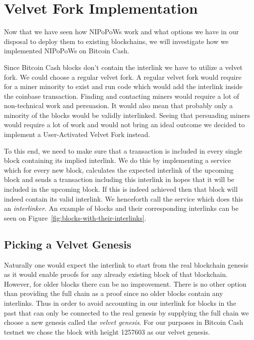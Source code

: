 \chapter{Velvet Fork Implementation}
Now that we have seen how NIPoPoWs work and what options we have in our disposal to deploy them to existing blockchains, we will investigate how we implemented NIPoPoWs on Bitcoin Cash.


Since Bitcoin Cash blocks don't contain the interlink we have to utilize a velvet fork. We could choose a regular velvet fork. A regular velvet fork would require for a miner minority to exist and run code which would add the interlink inside the coinbase transaction. Finding and contacting miners would require a lot of non-technical work and persuasion. It would also mean that probably only a minority of the blocks would be validly interlinked. Seeing that persuading miners would require a lot of work and would not bring an ideal outcome we decided to implement a User-Activated Velvet Fork instead.

To this end, we need to make sure that a transaction is included in every single block containing its implied interlink. We do this by implementing a service which for every new block, calculates the expected interlink of the upcoming block and sends a transaction including this interlink in hopes that it will be included in the upcoming block. If this is indeed achieved then that block will indeed contain its valid interlink. We henceforth call the service which does this an \emph{interlinker}. An example of blocks and their corresponding interlinks can be seen on Figure~\ref{fig:blocks-with-their-interlinks}.

\section{Picking a Velvet Genesis}
Naturally one would expect the interlink to start from the real blockchain genesis as it would enable proofs for any already existing block of that blockchain. However, for older blocks there can be no improvement. There is no other option than providing the full chain as a proof since no older blocks contain any interlinks. Thus in order to avoid accounting in our interlink for blocks in the past that can only be connected to the real genesis by supplying the full chain we choose a new genesis called the \emph{velvet genesis}. For our purposes in Bitcoin Cash testnet we chose the block with height 1257603 as our velvet genesis.

